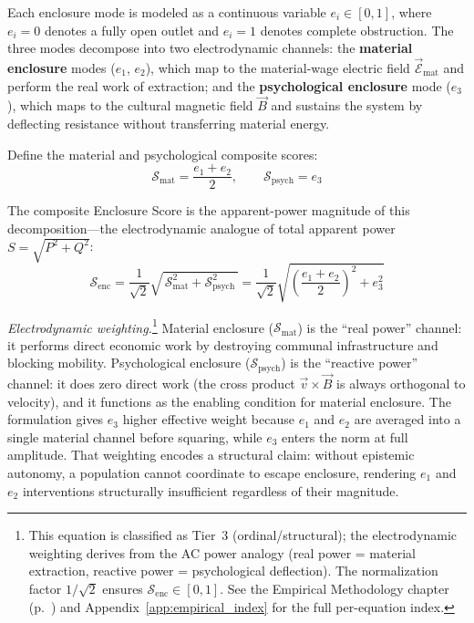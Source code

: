 Each enclosure mode is modeled as a continuous variable $e_i \in [0,1]$, where
$e_i = 0$ denotes a fully open outlet and $e_i = 1$ denotes complete obstruction.
The three modes decompose into two electrodynamic channels: the \textbf{material
enclosure} modes ($e_1$, $e_2$), which map to the material-wage electric field
$\vec{\mathcal{E}}_{\text{mat}}$ and perform the real work of extraction; and the
\textbf{psychological enclosure} mode ($e_3$), which maps to the cultural magnetic
field $\vec{B}$ and sustains the system by deflecting resistance without
transferring material energy.

Define the material and psychological composite scores:
\begin{equation}\label{eq:0.4-mat-psych-composite}
\mathcal{S}_{\text{mat}} = \frac{e_1 + e_2}{2}, \qquad \mathcal{S}_{\text{psych}} = e_3
\end{equation}

The composite Enclosure Score is the apparent-power magnitude of this
decomposition---the electrodynamic analogue of total apparent power
$S = \sqrt{P^2 + Q^2}$:
\begin{equation}\label{eq:1.1-enclosure-score}
\mathcal{S}_{\text{enc}} = \frac{1}{\sqrt{2}}\sqrt{\,\mathcal{S}_{\text{mat}}^{2} + \mathcal{S}_{\text{psych}}^{2}\,} = \frac{1}{\sqrt{2}}\sqrt{\left(\frac{e_1 + e_2}{2}\right)^{\!2} + e_3^{2}}
\end{equation}

\noindent\textit{Electrodynamic weighting.}\footnote{This equation is classified as Tier~3 (ordinal/structural); the electrodynamic weighting derives from the AC power analogy (real power = material extraction, reactive power = psychological deflection). The normalization factor $1/\sqrt{2}$ ensures $\mathcal{S}_{\text{enc}} \in [0,1]$. See the Empirical Methodology chapter (p.~\pageref{ch:empirical_methodology}) and Appendix~\ref{app:empirical_index} for the full per-equation index.} Material enclosure ($\mathcal{S}_{\text{mat}}$) is the ``real power'' channel: it performs direct economic work by destroying communal infrastructure and blocking mobility. Psychological enclosure ($\mathcal{S}_{\text{psych}}$) is the ``reactive power'' channel: it does zero direct work (the cross product $\vec{v} \times \vec{B}$ is always orthogonal to velocity), and it functions as the enabling condition for material enclosure. The formulation gives $e_3$ higher effective weight because $e_1$ and $e_2$ are averaged into a single material channel before squaring, while $e_3$ enters the norm at full amplitude. That weighting encodes a structural claim: without epistemic autonomy, a population cannot coordinate to escape enclosure, rendering $e_1$ and $e_2$ interventions structurally insufficient regardless of their magnitude.

